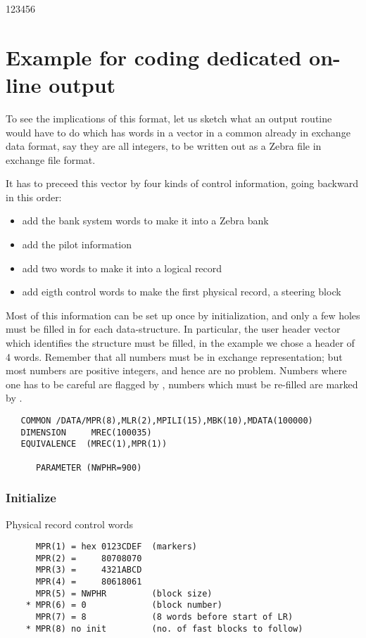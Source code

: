\begin{DLtt}{123456}
\section{Example for coding dedicated on-line output}

To see the implications of this format, let us sketch what
an output routine would have to do which has  words
in a vector  in a common  already in exchange data format,
say they are all integers,
to be written out as a Zebra file in exchange file format.

It has to preceed this vector by four kinds of control information,
going backward in this order:

\begin{itemize}
\item add the bank system words to make it into a Zebra bank
\item add the pilot information
\item add two words to make it into a logical record
\item add eigth control words to make the first physical record,
      a steering block
\end{itemize}

Most of this information can be set up once by initialization,
and only a few holes must be filled in for each data-structure.
In particular, the user header vector which identifies the
structure must be filled,
in the example we chose a header of 4 words.
Remember that all numbers must be in exchange representation;
but most numbers are positive integers, and hence are no problem.
Numbers where one has to be careful are flagged by \Lit{!!},
numbers which must be re-filled are marked by \Lit{*}.

\begin{verbatim}
   COMMON /DATA/MPR(8),MLR(2),MPILI(15),MBK(10),MDATA(100000)
   DIMENSION     MREC(100035)
   EQUIVALENCE  (MREC(1),MPR(1))

      PARAMETER (NWPHR=900)
\end{verbatim}

\subsubsection*{Initialize}

Physical record control words

\begin{verbatim}
      MPR(1) = hex 0123CDEF  (markers)
      MPR(2) =     80708070
      MPR(3) =     4321ABCD
      MPR(4) =     80618061
      MPR(5) = NWPHR         (block size)
    * MPR(6) = 0             (block number)
      MPR(7) = 8             (8 words before start of LR)
    * MPR(8) no init         (no. of fast blocks to follow)
\end{verbatim}


\end{DLtt}
